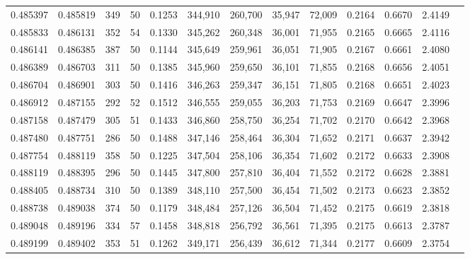 \begin{tabular}{rrrrrrrrrrrrr}
0.485397 & 0.485819 &   349 &  50 &                                     0.1253 & 344,910 & 260,700 &  35,947 &  72,009 & 0.2164 & 0.6670 & 2.4149 \\
0.485833 & 0.486131 &   352 &  54 &                                     0.1330 & 345,262 & 260,348 &  36,001 &  71,955 & 0.2165 & 0.6665 & 2.4116 \\
0.486141 & 0.486385 &   387 &  50 &                                     0.1144 & 345,649 & 259,961 &  36,051 &  71,905 & 0.2167 & 0.6661 & 2.4080 \\
0.486389 & 0.486703 &   311 &  50 &                                     0.1385 & 345,960 & 259,650 &  36,101 &  71,855 & 0.2168 & 0.6656 & 2.4051 \\
0.486704 & 0.486901 &   303 &  50 &                                     0.1416 & 346,263 & 259,347 &  36,151 &  71,805 & 0.2168 & 0.6651 & 2.4023 \\
0.486912 & 0.487155 &   292 &  52 &                                     0.1512 & 346,555 & 259,055 &  36,203 &  71,753 & 0.2169 & 0.6647 & 2.3996 \\
0.487158 & 0.487479 &   305 &  51 &                                     0.1433 & 346,860 & 258,750 &  36,254 &  71,702 & 0.2170 & 0.6642 & 2.3968 \\
0.487480 & 0.487751 &   286 &  50 &                                     0.1488 & 347,146 & 258,464 &  36,304 &  71,652 & 0.2171 & 0.6637 & 2.3942 \\
0.487754 & 0.488119 &   358 &  50 &                                     0.1225 & 347,504 & 258,106 &  36,354 &  71,602 & 0.2172 & 0.6633 & 2.3908 \\
0.488119 & 0.488395 &   296 &  50 &                                     0.1445 & 347,800 & 257,810 &  36,404 &  71,552 & 0.2172 & 0.6628 & 2.3881 \\
0.488405 & 0.488734 &   310 &  50 &                                     0.1389 & 348,110 & 257,500 &  36,454 &  71,502 & 0.2173 & 0.6623 & 2.3852 \\
0.488738 & 0.489038 &   374 &  50 &                                     0.1179 & 348,484 & 257,126 &  36,504 &  71,452 & 0.2175 & 0.6619 & 2.3818 \\
0.489048 & 0.489196 &   334 &  57 &                                     0.1458 & 348,818 & 256,792 &  36,561 &  71,395 & 0.2175 & 0.6613 & 2.3787 \\
0.489199 & 0.489402 &   353 &  51 &                                     0.1262 & 349,171 & 256,439 &  36,612 &  71,344 & 0.2177 & 0.6609 & 2.3754 \\

\end{tabular}
